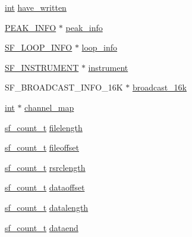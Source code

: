 \begin{DoxyCompactItemize}
\item 
\hyperlink{xmltok_8h_a5a0d4a5641ce434f1d23533f2b2e6653}{int} \hyperlink{structsf__private__tag_ac6a5ca05f37ab57aa894027ebe7b587b}{have\+\_\+written}
\item 
\hyperlink{struct_p_e_a_k___i_n_f_o}{P\+E\+A\+K\+\_\+\+I\+N\+FO} $\ast$ \hyperlink{structsf__private__tag_a63686dd650cc0688ec0710353a73d619}{peak\+\_\+info}
\item 
\hyperlink{struct_s_f___l_o_o_p___i_n_f_o}{S\+F\+\_\+\+L\+O\+O\+P\+\_\+\+I\+N\+FO} $\ast$ \hyperlink{structsf__private__tag_aa2593a83235ea0cb96478f2198d51e22}{loop\+\_\+info}
\item 
\hyperlink{struct_s_f___i_n_s_t_r_u_m_e_n_t}{S\+F\+\_\+\+I\+N\+S\+T\+R\+U\+M\+E\+NT} $\ast$ \hyperlink{structsf__private__tag_ad87471762060a5867a5e4ada7647c835}{instrument}
\item 
S\+F\+\_\+\+B\+R\+O\+A\+D\+C\+A\+S\+T\+\_\+\+I\+N\+F\+O\+\_\+16K $\ast$ \hyperlink{structsf__private__tag_a9fffdb6da27d9a0cb5e6585cbde9d840}{broadcast\+\_\+16k}
\item 
\hyperlink{xmltok_8h_a5a0d4a5641ce434f1d23533f2b2e6653}{int} $\ast$ \hyperlink{structsf__private__tag_a58c199a38ca7869b337113a082d778c7}{channel\+\_\+map}
\item 
\hyperlink{mac_2config_2i386_2lib-src_2libsndfile_2src_2sndfile_8h_a398121a5f562230ea7f772528fff5f84}{sf\+\_\+count\+\_\+t} \hyperlink{structsf__private__tag_aff3f5c2bc2a2a312a6ad71f2c38ea74d}{filelength}
\item 
\hyperlink{mac_2config_2i386_2lib-src_2libsndfile_2src_2sndfile_8h_a398121a5f562230ea7f772528fff5f84}{sf\+\_\+count\+\_\+t} \hyperlink{structsf__private__tag_a182c47220c95570e410519630a8998cf}{fileoffset}
\item 
\hyperlink{mac_2config_2i386_2lib-src_2libsndfile_2src_2sndfile_8h_a398121a5f562230ea7f772528fff5f84}{sf\+\_\+count\+\_\+t} \hyperlink{structsf__private__tag_afce8dce7d1ae259c82564e00bf4b6274}{rsrclength}
\item 
\hyperlink{mac_2config_2i386_2lib-src_2libsndfile_2src_2sndfile_8h_a398121a5f562230ea7f772528fff5f84}{sf\+\_\+count\+\_\+t} \hyperlink{structsf__private__tag_a62eab65784107dfa9ec026a4e0d5c80e}{dataoffset}
\item 
\hyperlink{mac_2config_2i386_2lib-src_2libsndfile_2src_2sndfile_8h_a398121a5f562230ea7f772528fff5f84}{sf\+\_\+count\+\_\+t} \hyperlink{structsf__private__tag_a6103a42652ababfafc5c6ee8cab05396}{datalength}
\item 
\hyperlink{mac_2config_2i386_2lib-src_2libsndfile_2src_2sndfile_8h_a398121a5f562230ea7f772528fff5f84}{sf\+\_\+count\+\_\+t} \hyperlink{structsf__private__tag_ad22f807c1c2ebff729928e7f01bd31dd}{dataend}

\end{DoxyCompactItemize}
